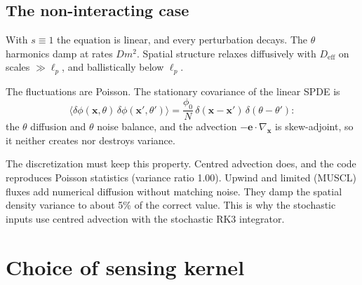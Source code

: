 \documentclass[11pt]{article}
\newcommand{\e}{\mathbf{e}}
\begin{document}
\subsection{The non-interacting case}
With $s\equiv1$ the equation is linear, and every perturbation decays. The
$\theta$ harmonics damp at rates $Dm^2$. Spatial structure relaxes
diffusively with $D_{\mathrm{eff}}$ on scales $\gg\ell_p$, and ballistically
below $\ell_p$.

The fluctuations are Poisson. The stationary covariance of the linear SPDE is
\begin{equation}
  \langle\delta\phi(\mathbf{x},\theta)\,\delta\phi(\mathbf{x}',\theta')\rangle
  = \frac{\phi_0}{N}\,\delta(\mathbf{x}-\mathbf{x}')\,\delta(\theta-\theta') :
\end{equation}
the $\theta$ diffusion and $\theta$ noise balance, and the advection
$-\e\cdot\nabla_{\mathbf{x}}$ is skew-adjoint, so it neither creates nor
destroys variance.

The discretization must keep this property. Centred advection does, and the
code reproduces Poisson statistics (variance ratio 1.00). Upwind and limited
(MUSCL) fluxes add numerical diffusion without matching noise. They damp the
spatial density variance to about 5\% of the correct value. This is why the
stochastic inputs use centred advection with the stochastic RK3 integrator.

\section{Choice of sensing kernel}
\end{document}

